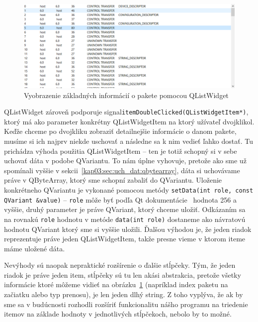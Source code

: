 \begin{figure}[!htb]
	\centering
	\includegraphics[width=\textwidth]{img/kap03_ListViewLook}
	\caption{Vyobrazenie základných informácií o pakete pomocou QListWidget}
	\label{obr:kap3:ListViewLook}
\end{figure}

QListWidget zároveň podporuje signal\newline \texttt{itemDoubleClicked(QListWidgetItem*)}, ktorý má ako parameter konkrétny QListWidgetItem na ktorý užívateľ dvojklikol. Keďže chceme po dvojkliku zobraziť detailnejšie informácie o danom pakete, musíme si ich najprv niekde uschovať a následne sa k nim vedieť ľahko dostať. Tu prichádza výhoda použitia QListWidgetItem -- ten je totiž schopný si v sebe uchovať dáta v podobe QVariantu. To nám úplne vyhovuje, pretože ako sme už spomínali vyššie v sekcii~\ref{kap03:sec:uch_dat:qbytearray}, dáta si uchovávame práve v QByteArray, ktorý sme schopní zabaliť do QVariantu. Uloženie konkrétneho QVariantu je vykonané pomocou metódy \texttt{setData(int role, const QVariant \&value)} -- \texttt{role} môže byť podľa Qt dokumentácie~\cite{qitemdatarole} hodnota 256 a vyššie, druhý parameter je práve QVariant, ktorý chceme uložiť. Odkázaním sa na rovnakú \texttt{role} hodnotu v metóde \texttt{data(int role)} dostaneme ako návratovú hodnotu QVariant ktorý sme si vyššie uložili. Ďalšou výhodou je, že jeden riadok reprezentuje práve jeden QListWidgetItem, takže presne vieme v ktorom iteme máme uložené dáta.

Nevýhody sú naopak nepraktické rozšírenie o ďalšie stĺpčeky. Tým, že jeden riadok je práve jeden item, stĺpčeky sú tu len akási abstrakcia, pretože všetky informácie ktoré môžeme vidieť na obrázku~\ref{obr:kap3:ListViewLook} (napríklad index paketu na začiatku alebo typ prenosu), je len jeden dlhý string. Z toho vyplýva, že ak by sme sa v budúcnosti rozhodli rozšíriť funkcionalitu nášho programu na triedenie itemov na základe hodnoty v jednotlivých stĺpčekoch, nebolo by to možné.

